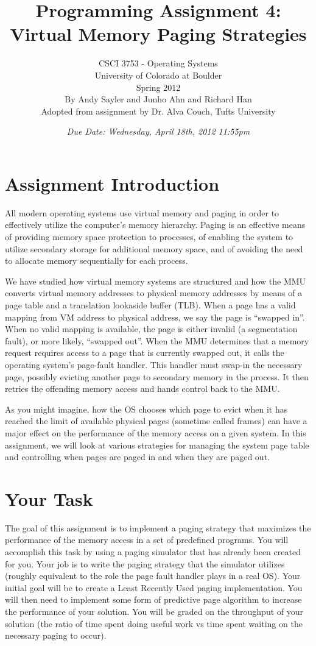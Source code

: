 \documentclass[12pt]{article}
\title{Programming Assignment 4:\\Virtual Memory Paging Strategies}
\author{
  CSCI 3753 - Operating Systems\\
  University of Colorado at Boulder\\
  Spring 2012\\
  By Andy Sayler and Junho Ahn and Richard Han\\
  Adopted from assignment by Dr. Alva Couch, Tufts University\cite{couch-a5}
}
\date{\emph{Due Date: Wednesday, April 18th, 2012 11:55pm}}
\begin{document}
\maketitle

\section{Assignment Introduction}

All modern operating systems use virtual memory and paging in order to
effectively utilize the computer's memory hierarchy. Paging is an
effective means of providing memory space protection to processes, of
enabling the system to utilize secondary storage for additional
memory space, and of avoiding the need to allocate memory sequentially
for each process.

We have studied how virtual memory systems are structured and how the MMU
converts virtual memory addresses to physical memory addresses by
means of a page table and a translation lookaside buffer (TLB). When a
page has a valid mapping from VM address to physical address, we say
the page is ``swapped in''. When no valid mapping is available, the page
is either invalid (a segmentation fault), or more likely, ``swapped
out''. When the MMU determines that a memory request requires access to
a page that is currently swapped out, it calls the operating system's
page-fault handler. This handler must swap-in the necessary page,
possibly evicting another page to secondary memory in the process.
It then retries the
offending memory access and hands control back to the MMU.

As you might imagine, how the OS chooses which page to evict when it
has reached the limit of available physical pages (sometime called
frames) can have a major
effect on the performance of the memory access on a given system.
In this assignment, we will look at various strategies for managing
the system page table and controlling when pages are paged in and when
they are paged out.

\section{Your Task}

The goal of this assignment is to implement a paging strategy that
maximizes the performance of the memory access in a
set of predefined programs. You will accomplish this task by using a
paging simulator that has already been created for you. Your job is to
write the paging strategy that the simulator utilizes (roughly
equivalent to the role the page fault handler plays in a real OS). Your
initial goal will be to create a Least Recently Used paging
implementation. You will then need to implement some form of predictive
page algorithm to increase the performance of your solution.
You will be graded
on the throughput of your solution (the ratio of time spent doing
useful work vs time spent waiting on the necessary paging to occur).
\end{document}
